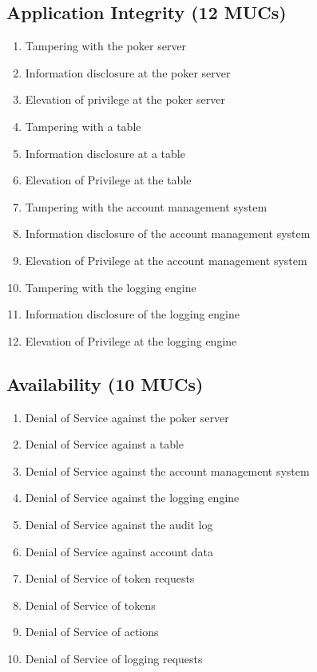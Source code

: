 \documentclass[a4paper,11pt]{report}
\begin{document}
\subsection{Application Integrity (12 MUCs)}
\label{ApplicationIntegrityMUCs}
\begin{enumerate}
\item Tampering with the poker server
\item Information disclosure at the poker server
\item Elevation of privilege at the poker server
\item Tampering with a table
\item Information disclosure at a table 
\item Elevation of Privilege at the table
\item Tampering with the account management system
\item Information disclosure of the account management system
\item Elevation of Privilege at the account management system 
\item Tampering with the logging engine 
\item Information disclosure of the logging engine 
\item Elevation of Privilege at the logging engine
\end{enumerate}

\subsection{Availability (10 MUCs)}
\begin{enumerate}
\item Denial of Service against the poker server
\item Denial of Service against a table 
\item Denial of Service against the account management system
\item Denial of Service against the logging engine
\item Denial of Service against the audit log
\item Denial of Service against account data
\item Denial of Service of token requests 
\item Denial of Service of tokens 
\item Denial of Service of actions
\item Denial of Service of logging requests
\end{enumerate}
\end{document}
